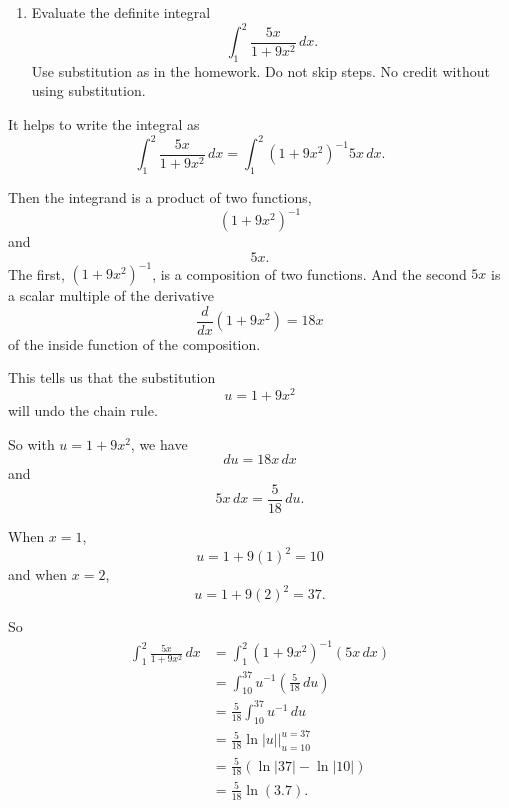 \documentclass{ximera}
\begin{document}
\begin{question} \label{QOererr3rr3}
\begin{enumerate}
\item Evaluate the definite integral
\[
      \int_1^2 \frac{5x}{1+9x^2}\, dx .
\]
Use substitution as in the homework. Do not skip steps. No credit without using substitution. 

\end{enumerate}

\begin{explanation}
It helps to write the integral as
\[
  \int_1^2 \frac{5x}{1+9x^2}\, dx = \int_1^2 (1+9x^2)^{-1}5x\, dx .
\]

Then the integrand is a product of two functions,
\[
        (1+9x^2)^{-1}
\]
and
\[
    5x .
\]
The first, $(1+9x^2)^{-1}$, is a composition of two functions. And the second $5x$ is a scalar multiple of the derivative
\[
 \frac{d}{dx}\left( 1+9x^2  \right) = 18x
\]
of the inside function of the composition.

This tells us that the substitution
\[
 u = 1 + 9x^2
\]
will undo the chain rule.

So with $u=1+9x^2$,  we have
\[
    du = 18x \, dx
\]
and 
\[
     5x\, dx = \frac{5}{18} \, du.
\]

When $x=1$,
\[
      u = 1+9(1)^2 = 10
\]
and when $x=2$,
\[
     u = 1+9(2)^2 = 37.
\]

So
\begin{align*}
\int_1^2 \frac{5x}{1+9x^2}\, dx  &= \int_1^2 (1+9x^2)^{-1} (5x \, dx)  \\
                                                  &= \int_{10}^{37} u^{-1} \left(  \frac{5}{18}\, du \right) \\
                                                  &= \frac{5}{18}\int_{10}^{37} u^{-1} \, du \\
                                                  & = \frac{5}{18}\ln \left| u \right| \Big|_{u=10}^{u=37} \\
                                                  &=\frac{5}{18} \left( \ln|37| - \ln|10| \right) \\
                                                  &= \frac{5}{18} \ln \left( 3.7 \right) .
\end{align*}

\end{explanation}
\end{question}
\end{document}
